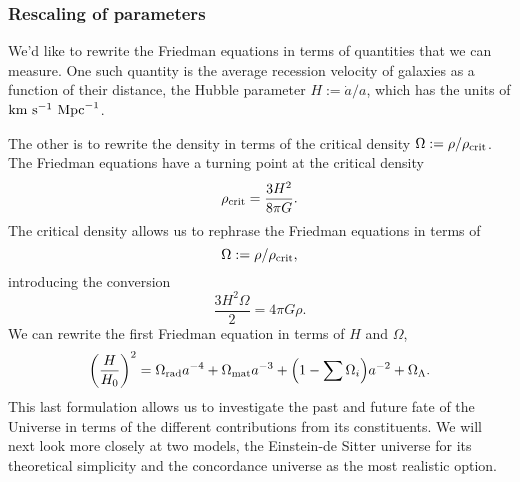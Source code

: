 \subsubsection{Rescaling of parameters}
We'd like to rewrite the Friedman equations in terms of quantities that we can measure. One such quantity is the average recession velocity of galaxies as a function of their distance, the Hubble parameter $H := \dot{a}/a$, which has the units of ${\rm km}\ {\rm s}^{-1}\ {\rm Mpc}^{-1}$.

The other is to rewrite the density in terms of the critical density $\Omega := \rho/\rho_{\rm crit}$. The Friedman equations have a turning point at the critical density
\[\rho_{\rm crit} = \frac{3H^2}{8 \pi G}.\]
The critical density allows us to rephrase the Friedman equations in terms of
\[\Omega := \rho / \rho_{\rm crit},\]
introducing the conversion
\[\frac{3 H^2 \Omega}{2} = 4 \pi G \rho.\]
We can rewrite the first Friedman equation in terms of $H$ and $\Omega$,
\begin{equation}
{\left(\frac{H}{H_0}\right)}^2 = \Omega_{\rm rad} a^{-4} + \Omega_{\rm mat}a^{-3}
+ \Big(1 - \sum\Omega_i\Big)a^{-2} + \Omega_{\Lambda}.
\end{equation}
This last formulation allows us to investigate the past and future fate of the Universe in terms of the different contributions from its constituents. We will next look more closely at two models, the Einstein-de Sitter universe for its theoretical simplicity and the concordance universe as the most realistic option.


